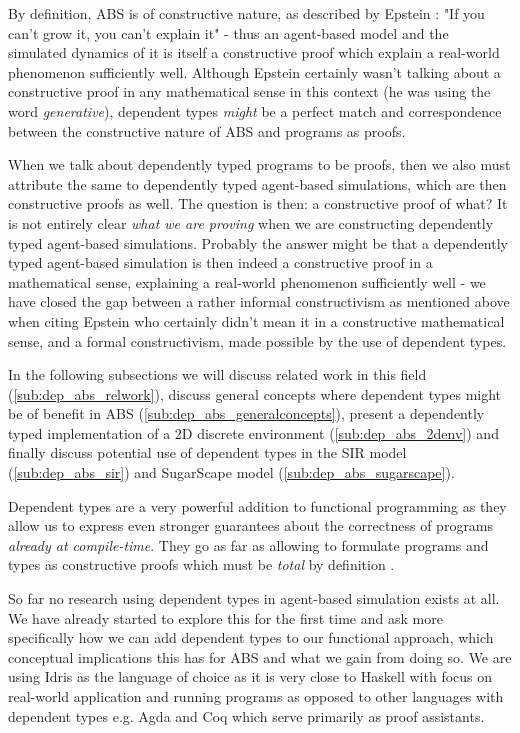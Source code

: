 By definition, ABS is of constructive nature, as described by Epstein \cite{epstein_chapter_2006}: "If you can't grow it, you can't explain it" - thus an agent-based model and the simulated dynamics of it is itself a constructive proof which explain a real-world phenomenon sufficiently well. Although Epstein certainly wasn't talking about a constructive proof in any mathematical sense in this context (he was using the word \textit{generative}), dependent types \textit{might} be a perfect match and correspondence between the constructive nature of ABS and programs as proofs.

When we talk about dependently typed programs to be proofs, then we also must attribute the same to dependently typed agent-based simulations, which are then constructive proofs as well. The question is then: a constructive proof of what? It is not entirely clear \textit{what we are proving} when we are constructing dependently typed agent-based simulations. Probably the answer might be that a dependently typed agent-based simulation is then indeed a constructive proof in a mathematical sense, explaining a real-world phenomenon sufficiently well - we have closed the gap between a rather informal constructivism as mentioned above when citing Epstein who certainly didn't mean it in a constructive mathematical sense, and a formal constructivism, made possible by the use of dependent types.

In the following subsections we will discuss related work in this field (\ref{sub:dep_abs_relwork}), discuss general concepts where dependent types might be of benefit in ABS (\ref{sub:dep_abs_generalconcepts}), present a dependently typed implementation of a 2D discrete environment (\ref{sub:dep_abs_2denv}) and finally discuss potential use of dependent types in the SIR model (\ref{sub:dep_abs_sir}) and SugarScape model (\ref{sub:dep_abs_sugarscape}).

Dependent types are a very powerful addition to functional programming as they allow us to express even stronger guarantees about the correctness of programs \textit{already at compile-time}. They go as far as allowing to formulate programs and types as constructive proofs which must be \textit{total} by definition \cite{thompson_type_1991, mckinna_why_2006, altenkirch_pi_2010}. 

So far no research using dependent types in agent-based simulation exists at all. We have already started to explore this for the first time and ask more specifically how we can add dependent types to our functional approach, which conceptual implications this has for ABS and what we gain from doing so. We are using Idris \cite{brady_idris_2013} as the language of choice as it is very close to Haskell with focus on real-world application and running programs as opposed to other languages with dependent types e.g. Agda and Coq which serve primarily as proof assistants.

